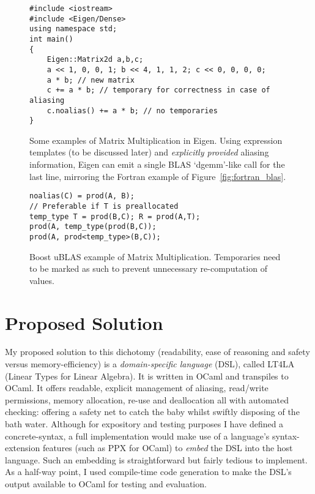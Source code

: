 \begin{figure}[tp]
    \centering
    \begin{verbatim}
#include <iostream>
#include <Eigen/Dense>
using namespace std;
int main()
{
    Eigen::Matrix2d a,b,c;
    a << 1, 0, 0, 1; b << 4, 1, 1, 2; c << 0, 0, 0, 0;
    a * b; // new matrix
    c += a * b; // temporary for correctness in case of aliasing
    c.noalias() += a * b; // no temporaries
}
    \end{verbatim}
    \caption{Some examples of Matrix Multiplication in Eigen. Using expression
        templates (to be discussed later) and \emph{explicitly provided} aliasing
        information, Eigen can emit a single BLAS `dgemm'-like call for the last
	line, mirroring the Fortran example of
	Figure~\ref{fig:fortran_blas}.}\label{fig:cpp_eigen}
\end{figure}

\begin{figure}[tp]
    \centering
    \begin{verbatim}
noalias(C) = prod(A, B);
// Preferable if T is preallocated
temp_type T = prod(B,C); R = prod(A,T);
prod(A, temp_type(prod(B,C));
prod(A, prod<temp_type>(B,C));
    \end{verbatim}
    \caption{Boost uBLAS example of Matrix Multiplication. Temporaries need to
        be marked as such to prevent unnecessary re-computation of
        values.}\label{fig:cpp_ublas}
\end{figure}

\section{Proposed Solution}\label{sec:prop_sol}

My proposed solution to this dichotomy (readability, ease of reasoning and
safety versus memory-efficiency) is a \emph{domain-specific language} (DSL),
called LT4LA (Linear Types for Linear Algebra). It is written in OCaml and
transpiles to OCaml. It offers readable, explicit management of aliasing,
read/write permissions, memory allocation, re-use and deallocation all with
automated checking: offering a safety net to catch the baby whilst swiftly
disposing of the bath water.  Although for expository and testing purposes I
have defined a concrete-syntax, a full implementation would make use of a
language's syntax-extension features (such as PPX for OCaml) to \emph{embed}
the DSL into the host language. Such an embedding is straightforward but fairly
tedious to implement. As a half-way point, I used compile-time code generation
to make the DSL's output available to OCaml for testing and evaluation.

